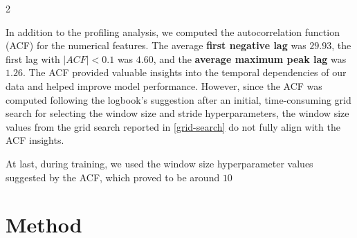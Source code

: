 \documentclass[11pt]{article}
\begin{document}
\begin{multicols}{2}
\begin{center}
            \label{heatmap-correlation}
        \end{center}
        In addition to the profiling analysis, we computed the autocorrelation function (ACF) for the numerical features. The average \textbf{first negative lag} was $29.93$, the first lag with $|ACF| < 0.1$ was $4.60$, and the \textbf{average maximum peak lag} was $ 1.26$. The ACF provided valuable insights into the temporal dependencies of our data and helped improve model performance. However, since the ACF was computed following the logbook’s suggestion after an initial, time-consuming grid search for selecting the window size and stride hyperparameters, the window size values from the grid search reported in \ref{grid-search} do not fully align with the ACF insights. 
        
        At last, during training, we used the window size hyperparameter values suggested by the ACF, which proved to be around $10$


        \section{Method}



\end{multicols}
\end{document}
